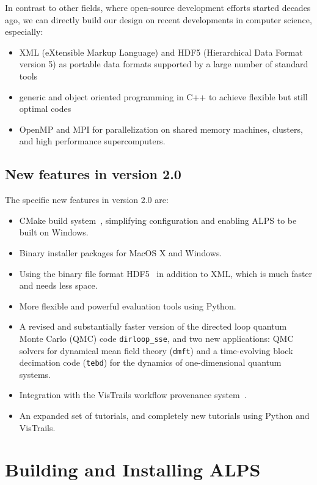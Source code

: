 \documentclass[12pt]{iopart}
\begin{document}
In contrast to other fields, where open-source development efforts started decades ago, we can directly build our design on recent developments in computer science, especially:
\begin{itemize}
\item XML\cite{xml} (eXtensible Markup Language) and HDF5\cite{hdf5} (Hierarchical Data Format version 5)  as portable data formats supported by a large number of standard tools
\item generic and object oriented programming in C++ to achieve flexible but still optimal codes
\item OpenMP\cite{openmp} and MPI\cite{mpi} for parallelization on shared memory machines, clusters, and high performance supercomputers.
\end{itemize} 


\subsection{New features in version 2.0}

The specific new features in version 2.0 are:
 \begin{itemize}
\item CMake build system~\cite{cmake}, simplifying configuration and enabling ALPS to be built on Windows.
\item Binary installer packages for MacOS X and Windows.
\item Using the binary file format HDF5~\cite{hdf5} in addition to XML, which is much faster and needs less space.
\item More flexible and powerful evaluation tools using Python.
\item A revised and substantially faster version of the directed loop quantum Monte Carlo (QMC) code {\tt dirloop\_sse}, and two new applications: QMC solvers for dynamical 
mean field theory ({\tt dmft}) and a time-evolving block decimation code ({\tt tebd}) for the dynamics of one-dimensional quantum systems.
\item Integration with the VisTrails workflow provenance system~\cite{vistrails}.
\item An expanded set of tutorials, and completely new tutorials using Python and VisTrails.
 \end{itemize}
 
 
\section{Building and Installing ALPS} \label{sct:build_and_install}
\end{document}
